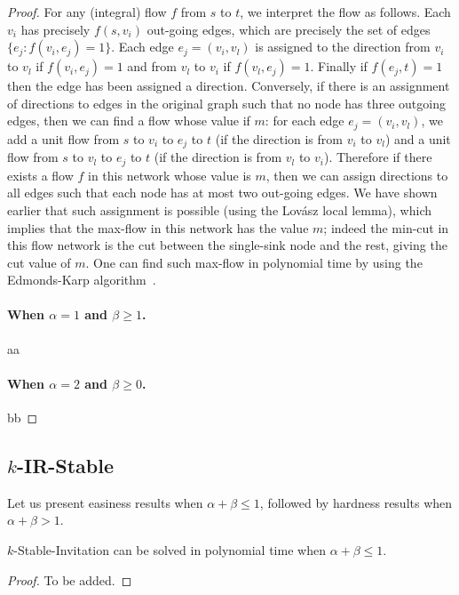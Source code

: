 \begin{proof}
For any (integral) flow $f$ from $s$ to $t$, we interpret the flow as follows. Each $v_i$ has precisely $f(s, v_i)$ out-going edges, which are precisely the set of edges $\{e_j : f(v_i, e_j) = 1\}$. Each edge $e_j = (v_i, v_l)$ is assigned to the direction from $v_i$ to $v_l$ if $f(v_i, e_j) = 1$ and from $v_l$ to $v_i$ if $f(v_l, e_j) = 1$. Finally if $f(e_j, t) = 1$ then the edge has been assigned a direction. Conversely, if there is an assignment of directions to edges in the original graph such that no node has three outgoing edges, then we can find a flow whose value if $m$: for each edge $e_j = (v_i, v_l)$, we add a unit flow from $s$ to $v_i$ to $e_j$ to $t$ (if the direction is from $v_i$ to $v_l$) and a unit flow from $s$ to $v_l$ to $e_j$ to $t$ (if the direction is from $v_l$ to $v_i$). Therefore if there exists a flow $f$ in this network whose value is $m$, then we can assign directions to all edges such that each node has at most two out-going edges.  We have shown earlier that such assignment is possible (using the Lov{\'a}sz local lemma), which implies that the max-flow in this network has the value $m$; indeed the min-cut in this flow network is the cut between the single-sink node and the rest, giving the cut value of $m$.  One can find such max-flow in polynomial time by using the Edmonds-Karp algorithm~\cite{EdmondsKarp}.


\paragraph{When $\alpha = 1$ and $\beta \geq 1$.}
aa

\paragraph{When $\alpha = 2$ and $\beta \geq 0$.}
bb

\end{proof}


\subsection{$k$-IR-Stable}

Let us present easiness results when $\alpha + \beta \leq 1$, followed by hardness results when $\alpha + \beta > 1$. 

\begin{theorem} \label{SIP:thm:stable_invitation_P}
	$k$-Stable-Invitation can be solved in polynomial time when $\alpha + \beta \leq 1$.
\end{theorem} 
\begin{proof} %
	To be added.
\end{proof}

